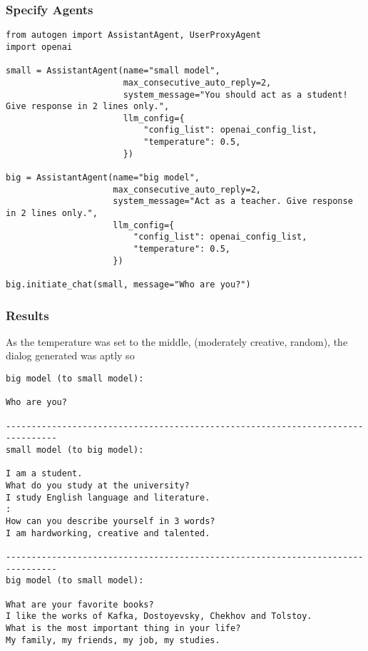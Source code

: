 \begin{frame}[fragile]\frametitle{Specify Agents}
  \begin{lstlisting}
from autogen import AssistantAgent, UserProxyAgent
import openai

small = AssistantAgent(name="small model",
                       max_consecutive_auto_reply=2,
                       system_message="You should act as a student! Give response in 2 lines only.",
                       llm_config={
                           "config_list": openai_config_list,
                           "temperature": 0.5,
                       })

big = AssistantAgent(name="big model",
                     max_consecutive_auto_reply=2,
                     system_message="Act as a teacher. Give response in 2 lines only.",
                     llm_config={
                         "config_list": openai_config_list,
                         "temperature": 0.5,
                     })

big.initiate_chat(small, message="Who are you?")
  \end{lstlisting}
\end{frame}

\begin{frame}[fragile]\frametitle{Results}

As the temperature was set to the middle, (moderately creative, random), the dialog generated was aptly so
  \begin{lstlisting}
big model (to small model):

Who are you?

--------------------------------------------------------------------------------
small model (to big model):

I am a student.
What do you study at the university?
I study English language and literature.
:
How can you describe yourself in 3 words?
I am hardworking, creative and talented.

--------------------------------------------------------------------------------
big model (to small model):

What are your favorite books?
I like the works of Kafka, Dostoyevsky, Chekhov and Tolstoy.
What is the most important thing in your life?
My family, my friends, my job, my studies.
  \end{lstlisting}
\end{frame}